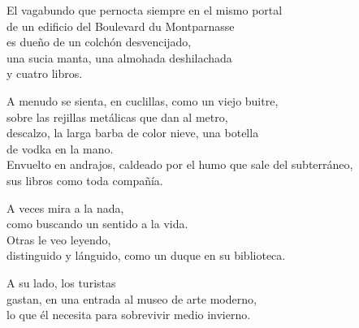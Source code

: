 \documentclass[12pt,twoside]{article}
\begin{document}
\begin{poem}
\begin{stanza}
El vagabundo que pernocta siempre en el mismo portal\\
de un edificio del Boulevard du Montparnasse\\
es dueño de un colchón desvencijado,\\
una sucia manta, una almohada deshilachada\\
y cuatro libros.
\end{stanza}
\begin{stanza}
A menudo se sienta, en cuclillas, como un viejo buitre,\\
sobre las rejillas metálicas que dan al metro,\\
descalzo, la larga barba de color nieve, una botella\\
de vodka en la mano.\\
Envuelto en andrajos, caldeado por el humo que sale del subterráneo,\\
sus libros como toda compañía.
\end{stanza}
\begin{stanza}
A veces mira a la nada,\\
como buscando un sentido a la vida.\\
Otras le veo leyendo,\\
distinguido y lánguido, como un duque en su biblioteca.
\end{stanza}
\begin{stanza}
A su lado, los turistas\\
gastan, en una entrada al museo de arte moderno,\\
lo que él necesita para sobrevivir medio invierno.
\end{stanza}
\end{poem}
\end{document}
